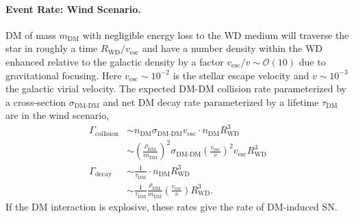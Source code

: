 \documentclass[preprintnumbers,amsmath,amssymb,prd, superscriptaddress,twocolumn]{revtex4}
\newcommand{\OO}{\mathcal{O}}
\def\r{\right)}
\def\l{\left(}
\begin{document}
\paragraph{Event Rate: Wind Scenario.}
DM of mass $m_\text{DM}$ with negligible energy loss to the WD medium will traverse the star in roughly a time $R_\text{WD}/v_\text{esc}$ and have a number density within the WD enhanced relative to the galactic density by a factor $v_\text{esc}/v \sim \OO(10)$ due to gravitational focusing.
Here $v_\text{esc} \sim 10^{-2} $ is the stellar escape velocity and $v \sim 10^{-3}$ the galactic virial velocity.
The expected DM-DM collision rate parameterized by a cross-section $\sigma_\text{DM-DM}$ and net DM decay rate parameterized by a lifetime $\tau_\text{DM}$ are in the wind scenario,
\begin{align}
  \Gamma_\text{collision}
  &\sim n_\text{DM} \sigma_\text{DM-DM} v_\text{esc}
  \cdot n_\text{DM} R_\text{WD}^3 \\
  &\sim \l \frac{\rho_\text{DM}}{m_\text{DM}} \r^2 \sigma_\text{DM-DM} \l \frac{v_\text{esc}}{v}\r^2 v_\text{esc} R_\text{WD}^3 \\
  \label{eq:collisionDM}
  \Gamma_\text{decay}
  &\sim \frac{1}{\tau_\text{DM}} \cdot n_\text{DM} R_\text{WD}^3 \\
  &\sim \frac{1}{\tau_\text{DM}} \frac{\rho_{\text{DM}}}{m_\text{DM}} \l \frac{v_\text{esc}}{v}\r R_\text{WD}^3.
  \label{eq:taugamma}
\end{align}
If the DM interaction is explosive, these rates give the rate of DM-induced SN.
\end{document}
